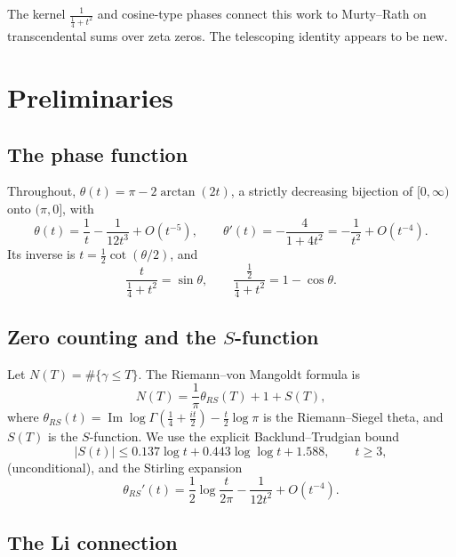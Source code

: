 \documentclass[11pt]{article}
\newcommand{\im}{\operatorname{Im}}
\begin{document}
The kernel $\frac1{\tfrac14+t^2}$ and cosine-type phases connect this work to
Murty--Rath \cite{MR2018} on transcendental sums over zeta zeros. The telescoping
identity appears to be new.

\section{Preliminaries}
\label{sec:prelim}

\subsection{The phase function}

Throughout, $\theta(t)=\pi-2\arctan(2t)$, a strictly decreasing bijection of
$[0,\infty)$ onto $(\pi,0]$, with
\begin{equation}\label{eq:theta-asym}
\theta(t)=\frac1t-\frac1{12t^3}+O(t^{-5}),\qquad
\theta'(t)=-\frac{4}{1+4t^2}=-\frac1{t^2}+O(t^{-4}).
\end{equation}
Its inverse is $t=\tfrac12\cot(\theta/2)$, and
\begin{equation}\label{eq:subst}
\frac{t}{\tfrac14+t^2}=\sin\theta,\qquad
\frac{\tfrac12}{\tfrac14+t^2}=1-\cos\theta.
\end{equation}

\subsection{Zero counting and the $S$-function}

Let $N(T)=\#\{\gamma\le T\}$. The Riemann--von Mangoldt formula is
\begin{equation*}
N(T)=\frac1\pi\theta_{RS}(T)+1+S(T),
\end{equation*}
where $\theta_{RS}(t)=\im\log\Gamma(\tfrac14+\tfrac{it}{2})-\tfrac t2\log\pi$ is the
Riemann--Siegel theta, and $S(T)$ is the $S$-function. We use the explicit Backlund--Trudgian bound \cite{Trudgian}
\begin{equation}\label{eq:backlund}
|S(t)|\le0.137\log t+0.443\log\log t+1.588,\qquad t\ge3,
\end{equation}
(unconditional), and the Stirling expansion
\begin{equation}\label{eq:stirling}
\theta_{RS}'(t)=\frac12\log\frac{t}{2\pi}-\frac1{12t^2}+O(t^{-4}).
\end{equation}

\subsection{The Li connection}
\end{document}

